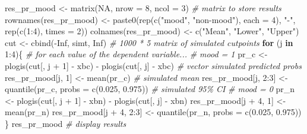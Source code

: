 \documentclass[
]{article}
\newenvironment{Shaded}{\begin{snugshade}}{\end{snugshade}}
\newcommand{\AttributeTok}[1]{\textcolor[rgb]{0.77,0.63,0.00}{#1}}
\newcommand{\CommentTok}[1]{\textcolor[rgb]{0.56,0.35,0.01}{\textit{#1}}}
\newcommand{\ConstantTok}[1]{\textcolor[rgb]{0.00,0.00,0.00}{#1}}
\newcommand{\ControlFlowTok}[1]{\textcolor[rgb]{0.13,0.29,0.53}{\textbf{#1}}}
\newcommand{\DecValTok}[1]{\textcolor[rgb]{0.00,0.00,0.81}{#1}}
\newcommand{\FloatTok}[1]{\textcolor[rgb]{0.00,0.00,0.81}{#1}}
\newcommand{\FunctionTok}[1]{\textcolor[rgb]{0.00,0.00,0.00}{#1}}
\newcommand{\NormalTok}[1]{#1}
\newcommand{\OtherTok}[1]{\textcolor[rgb]{0.56,0.35,0.01}{#1}}
\newcommand{\SpecialCharTok}[1]{\textcolor[rgb]{0.00,0.00,0.00}{#1}}
\newcommand{\StringTok}[1]{\textcolor[rgb]{0.31,0.60,0.02}{#1}}
\begin{document}
\begin{Shaded}
\begin{Highlighting}[]
\NormalTok{res\_pr\_mood }\OtherTok{\textless{}{-}} \FunctionTok{matrix}\NormalTok{(}\ConstantTok{NA}\NormalTok{, }\AttributeTok{nrow =} \DecValTok{8}\NormalTok{, }\AttributeTok{ncol =} \DecValTok{3}\NormalTok{) }\CommentTok{\# matrix to store results}
\FunctionTok{rownames}\NormalTok{(res\_pr\_mood) }\OtherTok{\textless{}{-}} \FunctionTok{paste0}\NormalTok{(}\FunctionTok{rep}\NormalTok{(}\FunctionTok{c}\NormalTok{(}\StringTok{"mood"}\NormalTok{, }\StringTok{"non{-}mood"}\NormalTok{), }\AttributeTok{each =} \DecValTok{4}\NormalTok{), }\StringTok{"{-}"}\NormalTok{,}
                                 \FunctionTok{rep}\NormalTok{(}\FunctionTok{c}\NormalTok{(}\DecValTok{1}\SpecialCharTok{:}\DecValTok{4}\NormalTok{), }\AttributeTok{times =} \DecValTok{2}\NormalTok{))}
\FunctionTok{colnames}\NormalTok{(res\_pr\_mood) }\OtherTok{\textless{}{-}} \FunctionTok{c}\NormalTok{(}\StringTok{"Mean"}\NormalTok{, }\StringTok{"Lower"}\NormalTok{, }\StringTok{"Upper"}\NormalTok{)}
\NormalTok{cut }\OtherTok{\textless{}{-}} \FunctionTok{cbind}\NormalTok{(}\SpecialCharTok{{-}}\ConstantTok{Inf}\NormalTok{, simt, }\ConstantTok{Inf}\NormalTok{) }\CommentTok{\# 1000 * 5 matrix of simulated cutpoints}
\ControlFlowTok{for}\NormalTok{ (j }\ControlFlowTok{in} \DecValTok{1}\SpecialCharTok{:}\DecValTok{4}\NormalTok{)\{ }\CommentTok{\# for each value of the dependent variable...}
  \CommentTok{\# mood = 1}
\NormalTok{  pr\_c }\OtherTok{\textless{}{-}} \FunctionTok{plogis}\NormalTok{(cut[, j }\SpecialCharTok{+} \DecValTok{1}\NormalTok{] }\SpecialCharTok{{-}}\NormalTok{ xbc) }\SpecialCharTok{{-}} \FunctionTok{plogis}\NormalTok{(cut[, j] }\SpecialCharTok{{-}}\NormalTok{ xbc) }\CommentTok{\# vector simulated predicted probs}
\NormalTok{  res\_pr\_mood[j, }\DecValTok{1}\NormalTok{] }\OtherTok{\textless{}{-}} \FunctionTok{mean}\NormalTok{(pr\_c) }\CommentTok{\# simulated mean}
\NormalTok{  res\_pr\_mood[j, }\DecValTok{2}\SpecialCharTok{:}\DecValTok{3}\NormalTok{] }\OtherTok{\textless{}{-}} \FunctionTok{quantile}\NormalTok{(pr\_c, }\AttributeTok{probs =} \FunctionTok{c}\NormalTok{(}\FloatTok{0.025}\NormalTok{, }\FloatTok{0.975}\NormalTok{)) }\CommentTok{\# simulated 95\% CI}
  \CommentTok{\# mood = 0}
\NormalTok{  pr\_n }\OtherTok{\textless{}{-}} \FunctionTok{plogis}\NormalTok{(cut[, j }\SpecialCharTok{+} \DecValTok{1}\NormalTok{] }\SpecialCharTok{{-}}\NormalTok{ xbn) }\SpecialCharTok{{-}} \FunctionTok{plogis}\NormalTok{(cut[, j] }\SpecialCharTok{{-}}\NormalTok{ xbn)}
\NormalTok{  res\_pr\_mood[j }\SpecialCharTok{+} \DecValTok{4}\NormalTok{, }\DecValTok{1}\NormalTok{] }\OtherTok{\textless{}{-}} \FunctionTok{mean}\NormalTok{(pr\_n) }
\NormalTok{  res\_pr\_mood[j }\SpecialCharTok{+} \DecValTok{4}\NormalTok{, }\DecValTok{2}\SpecialCharTok{:}\DecValTok{3}\NormalTok{] }\OtherTok{\textless{}{-}} \FunctionTok{quantile}\NormalTok{(pr\_n, }\AttributeTok{probs =} \FunctionTok{c}\NormalTok{(}\FloatTok{0.025}\NormalTok{, }\FloatTok{0.975}\NormalTok{)) }
\NormalTok{\}}
\NormalTok{res\_pr\_mood }\CommentTok{\# display results}
\end{Highlighting}
\end{Shaded}
\end{document}
